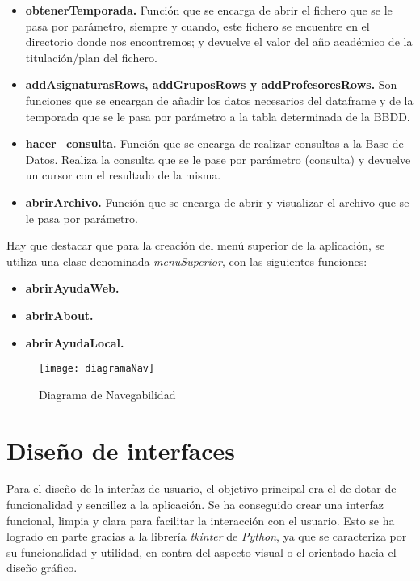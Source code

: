 \begin{itemize}
\item \textbf{obtenerTemporada.} Función que se encarga de abrir el fichero que se le pasa por parámetro, siempre y cuando, este fichero se encuentre en el directorio donde nos encontremos; y devuelve el valor del año académico de la titulación/plan del fichero.

\item \textbf{addAsignaturasRows, addGruposRows y addProfesoresRows.} Son funciones que se encargan de añadir los datos necesarios del dataframe y de la temporada que se le pasa por parámetro a la tabla determinada de la BBDD.

\item \textbf{hacer\_consulta.} Función que se encarga de realizar consultas a la Base de Datos. Realiza la consulta que se le pase por parámetro (consulta) y devuelve un cursor con el resultado de la misma.

\item \textbf{abrirArchivo.} Función que se encarga de abrir y visualizar el archivo que se le pasa por parámetro.

\end{itemize}

Hay que destacar que para la creación del menú superior de la aplicación, se utiliza una clase denominada \emph{menuSuperior}, con las siguientes funciones:
\begin{itemize}
\item \textbf{abrirAyudaWeb.}
\item \textbf{abrirAbout.}
\item \textbf{abrirAyudaLocal.}
\end{itemize}

\begin{figure}%
		\centering
		\texttt{[image: diagramaNav]}
		\caption{Diagrama de Navegabilidad}\label{fig:diagramaNav}
	\end{figure}
	




\section{Diseño de interfaces}

Para el diseño de la interfaz de usuario, el objetivo principal era el de dotar de funcionalidad y sencillez a la aplicación. Se ha conseguido crear  una interfaz funcional, limpia y clara para facilitar la interacción con el usuario.
Esto se ha logrado en parte gracias a la librería \emph{tkinter} de \emph{Python}, ya que se caracteriza por su funcionalidad y utilidad, en contra del aspecto visual o el orientado hacia el diseño gráfico.

